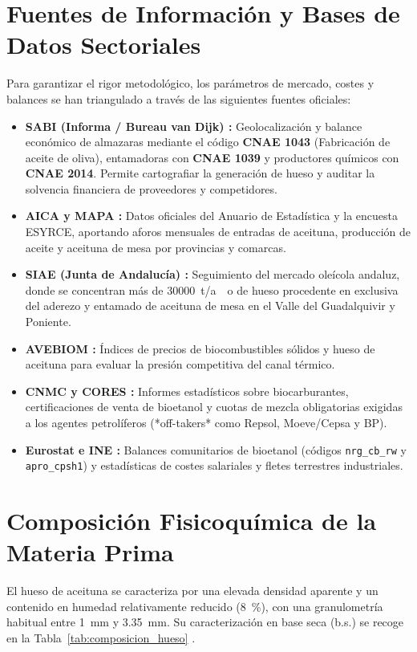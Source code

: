 \documentclass{report}
\begin{document}
\section{Fuentes de Información y Bases de Datos Sectoriales}
Para garantizar el rigor metodológico, los parámetros de mercado, costes y balances se han triangulado a través de las siguientes fuentes oficiales:
\begin{itemize}
    \item \textbf{SABI (Informa / Bureau van Dijk) \autocite{SABI2026}:} Geolocalización y balance económico de almazaras mediante el código \textbf{CNAE 1043} (Fabricación de aceite de oliva), entamadoras con \textbf{CNAE 1039} y productores químicos con \textbf{CNAE 2014}. Permite cartografiar la generación de hueso y auditar la solvencia financiera de proveedores y competidores.
    \item \textbf{AICA y MAPA \autocite{AICA2026, MAPA2025}:} Datos oficiales del Anuario de Estadística y la encuesta ESYRCE, aportando aforos mensuales de entradas de aceituna, producción de aceite y aceituna de mesa por provincias y comarcas.
    \item \textbf{SIAE (Junta de Andalucía) \autocite{SIAE2025}:} Seguimiento del mercado oleícola andaluz, donde se concentran más de \SI{30000}{\tonne/ao} de hueso procedente en exclusiva del aderezo y entamado de aceituna de mesa en el Valle del Guadalquivir y Poniente.
    \item \textbf{AVEBIOM \autocite{AVEBIOM2026}:} Índices de precios de biocombustibles sólidos y hueso de aceituna para evaluar la presión competitiva del canal térmico.
    \item \textbf{CNMC y CORES \autocite{CORES2026}:} Informes estadísticos sobre biocarburantes, certificaciones de venta de bioetanol y cuotas de mezcla obligatorias exigidas a los agentes petrolíferos (*off-takers* como Repsol, Moeve/Cepsa y BP).
    \item \textbf{Eurostat e INE \autocite{Eurostat2025, INE2025}:} Balances comunitarios de bioetanol (códigos \texttt{nrg\_cb\_rw} y \texttt{apro\_cpsh1}) y estadísticas de costes salariales y fletes terrestres industriales.
\end{itemize}

\section{Composición Fisicoquímica de la Materia Prima}
El hueso de aceituna se caracteriza por una elevada densidad aparente y un contenido en humedad relativamente reducido (\SI{8}{\percent}), con una granulometría habitual entre \SI{1}{\milli\meter} y \SI{3.35}{\milli\meter}. Su caracterización en base seca (b.s.) se recoge en la Tabla~\ref{tab:composicion_hueso} \autocite{Padilla-Rascon2022, MacArez2025}.
\end{document}
